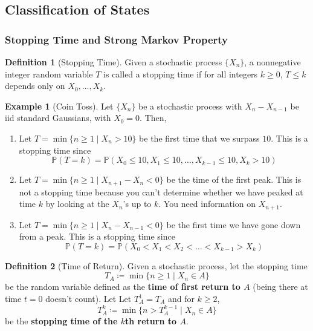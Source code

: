 \documentclass{article}
\theoremstyle{definition}
\newtheorem{example}{Example}[section]
\theoremstyle{remark}
\theoremstyle{definition}
\newtheorem{definition}{Definition}[section]
\begin{document}
\subsection{Classification of States}

\subsubsection{Stopping Time and Strong Markov Property}

\begin{definition}[Stopping Time]
Given a stochastic process $\{X_n\}$, a nonnegative integer random variable $T$ is called a stopping time if for all integers $k \geq 0$, $T \leq k$ depends only on $X_0, \ldots, X_k$. 
\end{definition}

\begin{example}[Coin Toss]
Let $\{X_n\}$ be a stochastic process with $X_n - X_{n - 1}$ be iid standard Gaussians, with $X_0 = 0$. Then, 
\begin{enumerate}
    \item Let $T = \min\{n \geq 1 \mid X_n > 10\}$ be the first time that we surpass $10$. This is a stopping time since 
    \[\mathbb{P}(T = k) = \mathbb{P}(X_0 \leq 10, X_1 \leq 10, \ldots, X_{k-1} \leq 10, X_{k} > 10)\]
    
    \item Let $T = \min\{n \geq 1 \mid X_{n+1} - X_n < 0\}$ be the time of the first peak. This is not a stopping time because you can't determine whether we have peaked at time $k$ by looking at the $X_n$'s up to $k$. You need information on $X_{n + 1}$. 
    
    \item Let $T = \min\{n \geq 1 \mid X_{n} - X_{n-1} < 0\}$ be the first time we have gone down from a peak. This is a stopping time since 
    \[\mathbb{P}(T = k) = \mathbb{P}(X_0 < X_1 < X_2 < \ldots < X_{k-1} > X_k)\]
\end{enumerate}
\end{example}

\begin{definition}[Time of Return]
Given a stochastic process, let the stopping time 
\[T_A \coloneqq \min \{ n \geq 1 \mid X_n \in A\}\]
be the random variable defined as the \textbf{time of first return to $A$} (being there at time $t = 0$ doesn't count). Let 
Let $T^1_A = T_A$ and for $k \geq 2$, 
\[T_A^k \coloneqq \min \{ n > T^{k-1}_A \mid X_n \in A\}\]
be the \textbf{stopping time of the $k$th return to $A$}. 
\end{definition}
\end{document}
